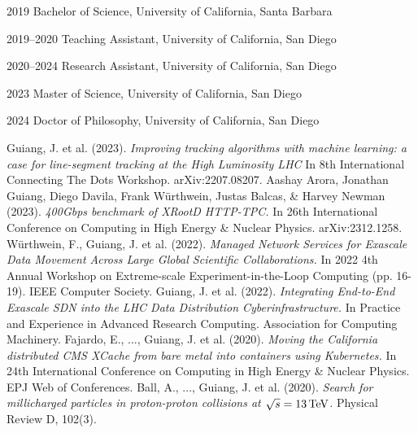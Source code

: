 \begin{vita}
\noindent
\begin{cv}{}
\begin{cvlist}{}
\item[2019] Bachelor of Science, University of California, Santa Barbara
\item[2019--2020] Teaching Assistant, University of California, San Diego
\item[2020--2024] Research Assistant, University of California, San Diego
\item[2023] Master of Science, University of California, San Diego
\item[2024] Doctor of Philosophy, University of California, San Diego
\end{cvlist}
\end{cv}

\publications
\noindent Guiang, J. et al. (2023). 
\textit{Improving tracking algorithms with machine learning: a case for line-segment tracking at the High Luminosity LHC}
In 8th International Connecting The Dots Workshop. arXiv:2207.08207.
\newline
\newline
\noindent Aashay Arora, Jonathan Guiang, Diego Davila, Frank Würthwein, Justas Balcas, \& Harvey Newman (2023). 
\textit{400Gbps benchmark of XRootD HTTP-TPC.}
In 26th International Conference on Computing in High Energy \& Nuclear Physics. arXiv:2312.1258.
\newline
\newline
\noindent W\"urthwein, F., Guiang, J. et al. (2022). 
\textit{Managed Network Services for Exascale Data Movement Across Large Global Scientific Collaborations.}
In 2022 4th Annual Workshop on Extreme-scale Experiment-in-the-Loop Computing (pp. 16-19). IEEE Computer Society.
\newline
\newline
\noindent Guiang, J. et al. (2022). 
\textit{Integrating End-to-End Exascale SDN into the LHC Data Distribution Cyberinfrastructure.}
In Practice and Experience in Advanced Research Computing. Association for Computing Machinery.
\newline
\newline
\noindent Fajardo, E., ..., Guiang, J. et al. (2020). 
\textit{Moving the California distributed CMS XCache from bare metal into containers using Kubernetes.}
In 24th International Conference on Computing in High Energy \& Nuclear Physics. EPJ Web of Conferences.
\newline
\newline
\noindent Ball, A., ..., Guiang, J. et al. (2020). 
\textit{Search for millicharged particles in proton-proton collisions at $\sqrt{s} = 13\,\text{Te\hspace{-.08em}V}$.}
Physical Review D, 102(3).
\end{vita}

